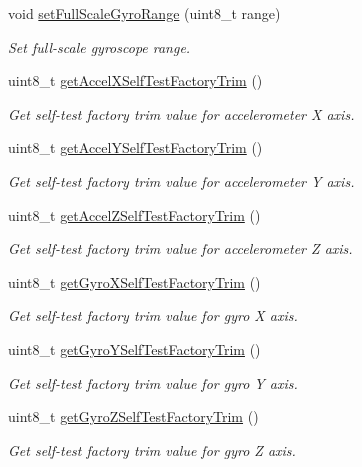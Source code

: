 \begin{DoxyCompactItemize}
void \mbox{\hyperlink{classMPU6050_a72afc0b6f221c9336f635b5637c62dae}{set\+Full\+Scale\+Gyro\+Range}} (uint8\+\_\+t range)
\begin{DoxyCompactList}\small\item\em Set full-\/scale gyroscope range. \end{DoxyCompactList}\item 
uint8\+\_\+t \mbox{\hyperlink{classMPU6050_a0cfaa7fbf63fb5867e003d490eb3fd96}{get\+Accel\+X\+Self\+Test\+Factory\+Trim}} ()
\begin{DoxyCompactList}\small\item\em Get self-\/test factory trim value for accelerometer X axis. \end{DoxyCompactList}\item 
uint8\+\_\+t \mbox{\hyperlink{classMPU6050_ae219dc9651d4d42a918e553b03e4e7bf}{get\+Accel\+Y\+Self\+Test\+Factory\+Trim}} ()
\begin{DoxyCompactList}\small\item\em Get self-\/test factory trim value for accelerometer Y axis. \end{DoxyCompactList}\item 
uint8\+\_\+t \mbox{\hyperlink{classMPU6050_a455f63be2ea810cac26d583da6915050}{get\+Accel\+Z\+Self\+Test\+Factory\+Trim}} ()
\begin{DoxyCompactList}\small\item\em Get self-\/test factory trim value for accelerometer Z axis. \end{DoxyCompactList}\item 
uint8\+\_\+t \mbox{\hyperlink{classMPU6050_a9e50a2644c5ac8c9ac4270c86fd18a93}{get\+Gyro\+X\+Self\+Test\+Factory\+Trim}} ()
\begin{DoxyCompactList}\small\item\em Get self-\/test factory trim value for gyro X axis. \end{DoxyCompactList}\item 
uint8\+\_\+t \mbox{\hyperlink{classMPU6050_ae3e0610d6d3bb8162c4d5c99e0f53106}{get\+Gyro\+Y\+Self\+Test\+Factory\+Trim}} ()
\begin{DoxyCompactList}\small\item\em Get self-\/test factory trim value for gyro Y axis. \end{DoxyCompactList}\item 
uint8\+\_\+t \mbox{\hyperlink{classMPU6050_a6aecb64dc804f1238e56626ae13b4c79}{get\+Gyro\+Z\+Self\+Test\+Factory\+Trim}} ()
\begin{DoxyCompactList}\small\item\em Get self-\/test factory trim value for gyro Z axis. \end{DoxyCompactList}\item 

\end{DoxyCompactItemize}
